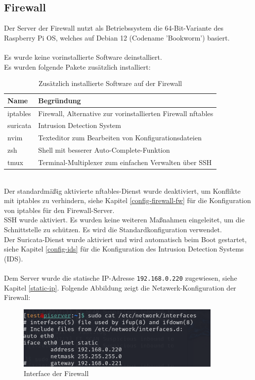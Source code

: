 \documentclass[
    a4paper,
    pagesize,
	pdftex,
    12pt,
]{scrartcl}
\begin{document}
\subsection{Firewall}
Der Server der Firewall nutzt als Betriebssystem die 64-Bit-Variante des Raspberry Pi OS, welches auf Debian 12 (Codename 'Bookworm') basiert.
\\ \\
Es wurde keine vorinstallierte Software deinstalliert.
\\
Es wurden folgende Pakete zusätzlich installiert:
\begin{table}[h!]
	\begin{center}
		\label{tab:table1}
		\begin{tabular}{l|l }
			\textbf{Name} & \textbf{Begründung} \\
			\hline
			iptables & Firewall, Alternative zur vorinstallierten Firewall nftables \\
			suricata & Intrusion Detection System \\
			nvim & Texteditor zum Bearbeiten von Konfigurationsdateien \\
			zsh & Shell mit besserer Auto-Complete-Funktion \\
			tmux & Terminal-Multiplexer zum einfachen Verwalten über SSH \\
		\end{tabular}
		\caption{Zusätzlich installierte Software auf der Firewall}
	\end{center}
\end{table}
\\
Der standardmäßig aktivierte nftables-Dienst wurde deaktiviert, um Konflikte mit iptables zu verhindern, siehe Kapitel \ref{config-firewall-fw} für die Konfiguration von iptables für den Firewall-Server. \\
SSH wurde aktiviert. Es wurden keine weiteren Maßnahmen eingeleitet, um die Schnittstelle zu schützen. Es wird die Standardkonfiguration verwendet. \\
Der Suricata-Dienst wurde aktiviert und wird automatisch beim Boot gestartet, siehe Kapitel \ref{config-ids} für die Konfiguration des Intrusion Detection Systems (IDS). \\ \\
Dem Server wurde die statische IP-Adresse \lstinline[breaklines]|192.168.0.220| zugewiesen, siehe Kapitel \ref{static-ip}. Folgende Abbildung zeigt die Netzwerk-Konfiguration der Firewall:

\begin{figure}[!ht]
	\centering
	\includegraphics[width=10cm]{interface-firewall.png}
	\caption{Interface der Firewall}
	\label{fig:interface-firewall}
\end{figure}
\end{document}
